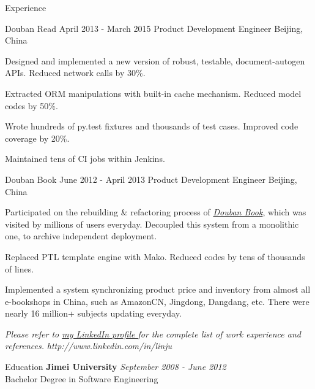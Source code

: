 \documentclass{resume}
\begin{document}
\begin{rSection}{Experience}
    \begin{rSubsection}{ Douban Read }{ April 2013 - March 2015 }{ Product Development Engineer }{Beijing, China}
    \item Designed and implemented a new version of robust, testable, document-autogen APIs. Reduced network calls by 30\%.
    \item Extracted ORM manipulations with built-in cache mechanism. Reduced model codes by 50\%.
    \item Wrote hundreds of py.test fixtures and thousands of test cases. Improved code coverage by 20\%.
    \item Maintained tens of CI jobs within Jenkins.
    \end{rSubsection}

    \begin{rSubsection}{Douban Book}{ June 2012 - April 2013 }{ Product Development Engineer }{Beijing, China}
    \item Participated on the rebuilding \& refactoring process of \href{book.douban.com}{\textit {Douban Book}}, which was visited by millions of users everyday. Decoupled this system from a monolithic one, to archive independent deployment.
    \item Replaced PTL template engine with Mako.  Reduced codes by tens of thousands of lines.
    \item Implemented a system synchronizing product price and inventory from almost all e-bookshops in China, such as AmazonCN, Jingdong, Dangdang, etc. There were nearly 16 million+ subjects updating everyday.
    \end{rSubsection}

  \end{rSection}

  \begin{center}
  \textit{ Please refer to \href{http://www.linkedin.com/in/linju}{ my LinkedIn profile } for the complete list of work experience and references.}
  \textit{ http://www.linkedin.com/in/linju }
  \end{center}

  \newpage

  \begin{rSection}{Education}
    { \bf Jimei University  } \hfill {\em September 2008 - June 2012 } \\
    { Bachelor Degree in Software Engineering } \\
  \end{rSection}
\end{document}
